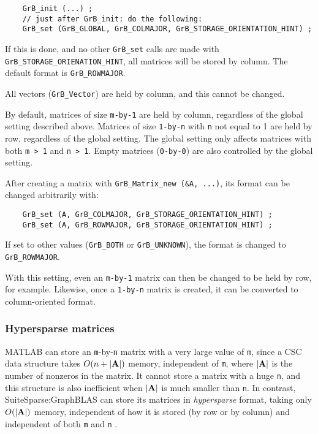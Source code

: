     {\footnotesize
    \begin{verbatim}
    GrB_init (...) ;
    // just after GrB_init: do the following:
    GrB_set (GrB_GLOBAL, GrB_COLMAJOR, GrB_STORAGE_ORIENTATION_HINT) ; \end{verbatim} }

If this is done, and no other \verb'GrB_set' calls are made with \newline
\verb'GrB_STORAGE_ORIENATION_HINT', all matrices will be stored by column.
The default format is \verb'GrB_ROWMAJOR'.

All vectors (\verb'GrB_Vector') are held by column, and this cannot be changed.

By default, matrices of size \verb'm-by-1' are held by column, regardless of
the global setting described above.  Matrices of size \verb'1-by-n' with
\verb'n' not equal to 1 are held by row, regardless of the global setting.
The global setting only affects matrices with both \verb'm > 1' and \verb'n > 1'.
Empty matrices (\verb'0-by-0') are also controlled by the global setting.

After creating a matrix with \verb'GrB_Matrix_new (&A, ...)',
its format can be changed arbitrarily with:

    {\footnotesize
    \begin{verbatim}
    GrB_set (A, GrB_COLMAJOR, GrB_STORAGE_ORIENTATION_HINT) ;
    GrB_set (A, GrB_ROWMAJOR, GrB_STORAGE_ORIENTATION_HINT) ; \end{verbatim} }

If set to other values (\verb'GrB_BOTH' or \verb'GrB_UNKNOWN'), the
format is changed to \verb'GrB_ROWMAJOR'.

With this setting, even an \verb'm-by-1' matrix can then be changed to be held
by row, for example.  Likewise, once a \verb'1-by-n' matrix is created, it can
be converted to column-oriented format.

\subsubsection{Hypersparse matrices}
\label{hypersparse}

MATLAB can store an \verb'm'-by-\verb'n' matrix with a very large value of
\verb'm', since a CSC data structure takes $O(n+|{\bf A}|)$ memory, independent
of \verb'm', where $|{\bf A}|$ is the number of nonzeros in the matrix.  It
cannot store a matrix with a huge \verb'n', and this structure is also
inefficient when $|{\bf A}|$ is much smaller than \verb'n'.  In contrast,
SuiteSparse:GraphBLAS can store its matrices in {\em hypersparse} format,
taking only $O(|{\bf A}|)$ memory, independent of how it is stored (by row or
by column) and independent of both \verb'm' and \verb'n'
\cite{BulucGilbert08,BulucGilbert12}.

